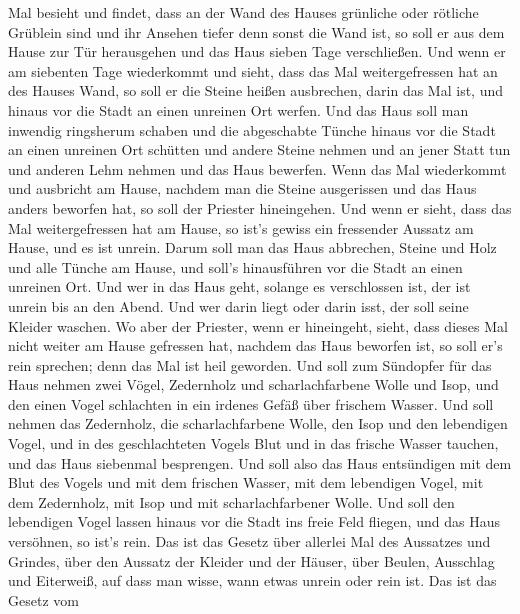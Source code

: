 Mal besieht und findet, dass an der Wand des Hauses grünliche oder
rötliche Grüblein sind und ihr Ansehen tiefer denn sonst die Wand ist,
 so soll er aus dem Hause zur Tür herausgehen und das Haus
sieben Tage verschließen.  Und wenn er am siebenten Tage
wiederkommt und sieht, dass das Mal weitergefressen hat an des Hauses
Wand,  so soll er die Steine heißen ausbrechen, darin das
Mal ist, und hinaus vor die Stadt an einen unreinen Ort werfen.
 Und das Haus soll man inwendig ringsherum schaben und die
abgeschabte Tünche hinaus vor die Stadt an einen unreinen Ort schütten
 und andere Steine nehmen und an jener Statt tun und
anderen Lehm nehmen und das Haus bewerfen.  Wenn das Mal
wiederkommt und ausbricht am Hause, nachdem man die Steine ausgerissen
und das Haus anders beworfen hat,  so soll der Priester
hineingehen. Und wenn er sieht, dass das Mal weitergefressen hat am
Hause, so ist's gewiss ein fressender Aussatz am Hause, und es ist
unrein.  Darum soll man das Haus abbrechen, Steine und Holz
und alle Tünche am Hause, und soll's hinausführen vor die Stadt an einen
unreinen Ort.  Und wer in das Haus geht, solange es
verschlossen ist, der ist unrein bis an den Abend.  Und wer
darin liegt oder darin isst, der soll seine Kleider waschen.
 Wo aber der Priester, wenn er hineingeht, sieht, dass
dieses Mal nicht weiter am Hause gefressen hat, nachdem das Haus
beworfen ist, so soll er's rein sprechen; denn das Mal ist heil
geworden.  Und soll zum Sündopfer für das Haus nehmen zwei
Vögel, Zedernholz und scharlachfarbene Wolle und Isop,  und
den einen Vogel schlachten in ein irdenes Gefäß über frischem Wasser.
 Und soll nehmen das Zedernholz, die scharlachfarbene
Wolle, den Isop und den lebendigen Vogel, und in des geschlachteten
Vogels Blut und in das frische Wasser tauchen, und das Haus siebenmal
besprengen.  Und soll also das Haus entsündigen mit dem
Blut des Vogels und mit dem frischen Wasser, mit dem lebendigen Vogel,
mit dem Zedernholz, mit Isop und mit scharlachfarbener Wolle.
 Und soll den lebendigen Vogel lassen hinaus vor die Stadt
ins freie Feld fliegen, und das Haus versöhnen, so ist's rein.
 Das ist das Gesetz über allerlei Mal des Aussatzes und
Grindes,  über den Aussatz der Kleider und der Häuser,
 über Beulen, Ausschlag und Eiterweiß,  auf
dass man wisse, wann etwas unrein oder rein ist. Das ist das Gesetz vom
